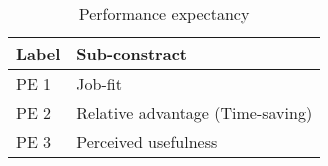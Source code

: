 \begin{table}[H]
\centering
\begin{tabular}{p{1cm} p{14cm}}

\toprule
Label & Sub-constract \\
\midrule
PE 1    &	Job-fit \\
PE 2    &	Relative advantage (Time-saving) \\
PE 3    &	Perceived usefulness \\

\bottomrule

\end{tabular}
\caption{Performance expectancy}
\end{table}